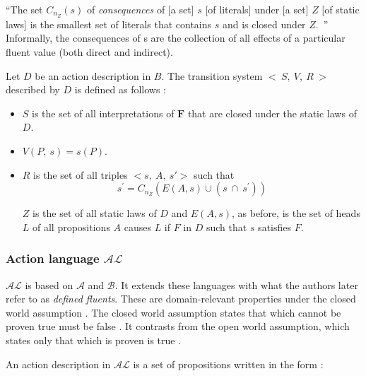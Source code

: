 \begin{definition}
    ``The set $C_{n_Z}\left(s\right)$ of \textit{consequences} of [a set] $s$ [of literals] under [a set] $Z$ [of static laws] is the smallest set of literals that contains $s$ and is closed under $Z$.~\cite{gelfond_action_1998}''
    Informally, the consequences of s are the collection of all effects of a particular fluent value (both direct and indirect).
\end{definition}

\begin{definition}

    Let $D$ be an action description in $B$.
    The transition system $<\ S,\ V,\ R\ >$ described by $D$ is defined as follows \cite{gelfond_action_1998}:

    \begin{itemize}
        \item $S$ is the set of all interpretations of $\boldsymbol{F}$ that are closed under the static laws of $D$.
        \item $V(P,\ s)=s(P)$.
        \item $R$ is the set of all triples $<s,\ A,\ s\prime>$ such that
            $$
            s^\prime=C_{n_Z}\left(E\left(A,s\right)\cup\left(s\ \cap\ s^\prime\right)\right)
            $$

            $ Z $ is the set of all static laws of $D$ and $E(A, s)$, as before, is the set of heads $L$ of all propositions $A$ causes $L$ if $F$ in $D$ such that $s$ satisfies $F$.
    \end{itemize}
\end{definition}

\subsubsection{Action language $ \mathcal{AL} $}
\label{subsubsec:action_language_al}

$ \mathcal{AL} $ is based on $ \mathcal{A} $ and $ \mathcal{B} $.
It extends these languages with what the authors later refer to as \textit{defined fluents}.
These are domain-relevant properties under the closed world assumption \cite{blount_architecture_2013}.
The closed world assumption states that which cannot be proven true must be false \cite{reiter_closed_1981}.
It contrasts from the open world assumption, which states only that which is proven is true \cite{reiter_closed_1981}.

An action description in $ \mathcal{AL} $ is a set of propositions written in the form \cite{baral_reasoning_2000, blount_architecture_2013}:

